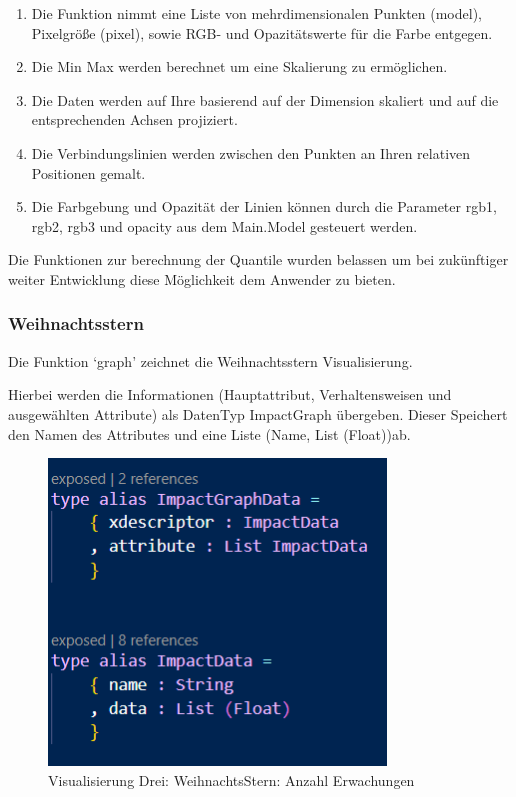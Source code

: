\documentclass[usegeometry=true]{scrartcl}
\begin{document}
\begin {enumerate}
\item Die Funktion nimmt eine Liste von mehrdimensionalen Punkten (model), Pixelgröße (pixel), sowie RGB- und Opazitätswerte für die Farbe entgegen.
\item Die Min Max werden berechnet um eine Skalierung zu ermöglichen.
\item Die Daten werden auf Ihre basierend auf der Dimension skaliert und auf die entsprechenden Achsen projiziert.
\item Die Verbindungslinien werden zwischen den Punkten an Ihren relativen Positionen gemalt.
\item Die Farbgebung und Opazität der Linien können durch die Parameter rgb1, rgb2, rgb3 und opacity aus dem Main.Model gesteuert werden.
\end{enumerate}

Die Funktionen zur berechnung der Quantile wurden belassen um bei zukünftiger weiter Entwicklung diese Möglichkeit dem Anwender zu bieten.

\subsubsection{Weihnachtsstern}
Die Funktion `graph' zeichnet die Weihnachtsstern Visualisierung.

Hierbei werden die Informationen (Hauptattribut, Verhaltensweisen und ausgewählten Attribute) als DatenTyp ImpactGraph übergeben. Dieser Speichert den Namen des Attributes und eine Liste (Name, List (Float))ab. 


\begin{figure}[h]
  \centering
  \includegraphics [width = 0.8\textwidth]{ImpactGraphData.JPG}
  \caption{Visualisierung Drei: WeihnachtsStern: Anzahl Erwachungen }
\end{figure}
\end{document}
